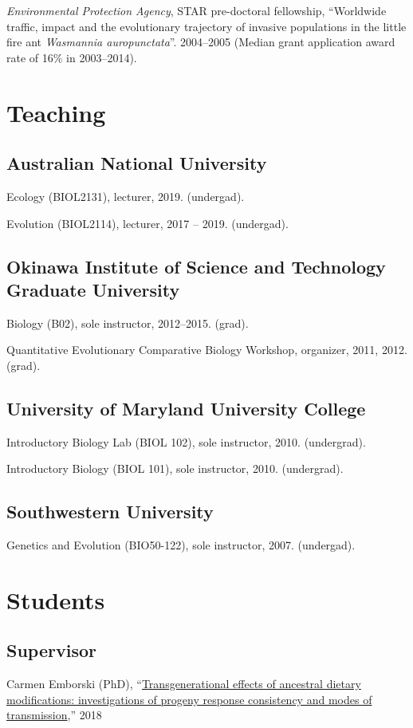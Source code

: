 \documentclass[11pt]{article}
\begin{document}
\ind \textit{Environmental Protection Agency}, STAR pre-doctoral fellowship, ``Worldwide traffic, impact and the evolutionary trajectory of invasive
populations in the little fire ant \textit{Wasmannia auropunctata}''.  2004--2005 (Median grant application award rate of 16\% in 2003--2014).



\section{Teaching}

\subsection{Australian National University}
\ind Ecology (BIOL2131), lecturer, 2019. (undergad).

\ind Evolution (BIOL2114), lecturer, 2017 -- 2019. (undergad).

\subsection{Okinawa Institute of Science and Technology Graduate University}
\ind Biology (B02), sole instructor, 2012--2015. (grad).

\ind Quantitative Evolutionary Comparative Biology Workshop, organizer, 2011, 2012. (grad).

\subsection{University of Maryland University College}
\ind Introductory Biology Lab (BIOL 102), sole instructor, 2010. (undergrad).

\ind Introductory Biology (BIOL 101), sole instructor, 2010. (undergrad).

\subsection{Southwestern University}
\ind Genetics and Evolution (BIO50-122), sole instructor, 2007. (undergad).


\section{Students}

\subsection{Supervisor}
\ind Carmen Emborski (PhD), ``\href{https://ttu-ir.tdl.org/bitstream/handle/2346/74394/EMBORSKI-DISSERTATION-2018.pdf}{Transgenerational effects of ancestral dietary modifications:
investigations of progeny response consistency and modes of transmission},'' 2018
\end{document}
